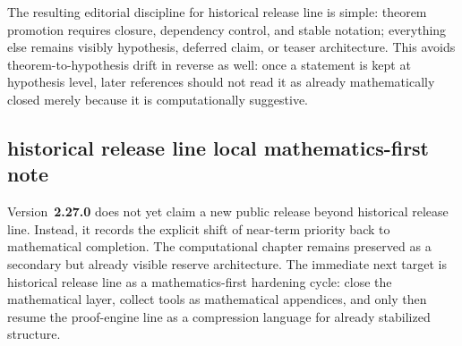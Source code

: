 \documentclass[12pt,a4paper]{article}
\DeclareRobustCommand{\QSCver}[1]{archival stage}
\renewcommand{\QSCver}[1]{historical release line}
\begin{document}
The resulting editorial discipline for \QSCver{v2.27.0} is simple: theorem promotion requires closure, dependency control, and stable notation; everything else remains visibly hypothesis, deferred claim, or teaser architecture. This avoids theorem-to-hypothesis drift in reverse as well: once a statement is kept at hypothesis level, later references should not read it as already mathematically closed merely because it is computationally suggestive.

\subsection*{\QSCver{v2.26.33} local mathematics-first note}

Version~\textbf{2.27.0} does not yet claim a new public release beyond \QSCver{v2.26.0}. Instead, it records the explicit shift of near-term priority back to mathematical completion. The computational chapter remains preserved as a secondary but already visible reserve architecture. The immediate next target is \QSCver{v2.27.0} as a mathematics-first hardening cycle: close the mathematical layer, collect tools as mathematical appendices, and only then resume the proof-engine line as a compression language for already stabilized structure.
\end{document}
